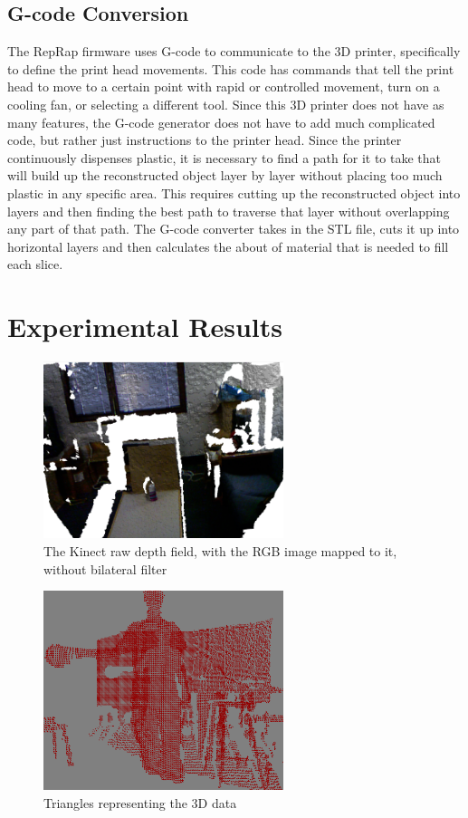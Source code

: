 \documentclass[pdftex,10.5pt]{report}
\begin{document}
\subsection{G-code Conversion}
The RepRap firmware uses G-code to communicate to the 3D printer, specifically to define the print head movements. This code has commands that tell the print head to move to a certain point with rapid or controlled movement, turn on a cooling fan, or selecting a different tool. Since this 3D printer does not have as many features, the G-code generator does not have to add much complicated code, but rather just instructions to the printer head. Since the printer continuously dispenses plastic, it is necessary to find a path for it to take that will build up the reconstructed object layer by layer without placing too much plastic in any specific area. This requires cutting up the reconstructed object into layers and then finding the best path to traverse that layer without overlapping any part of that path. The G-code converter takes in the STL file, cuts it up into horizontal layers and then calculates the about of material that is needed to fill each slice. 

\section{Experimental Results}

\begin{figure}[H]
	\centering
	\includegraphics[width=70mm]{figures/kinectwaterbottle.png}
	\caption{The Kinect raw depth field, with the RGB image mapped to it, without bilateral filter}
	\label{waterbot}
\end{figure}

\begin{figure}[H]
	\centering
	\includegraphics[width=70mm]{figures/3dtriangles.png}
	\caption{Triangles representing the 3D data}
	\label{3dtri}
\end{figure}
\end{document}
